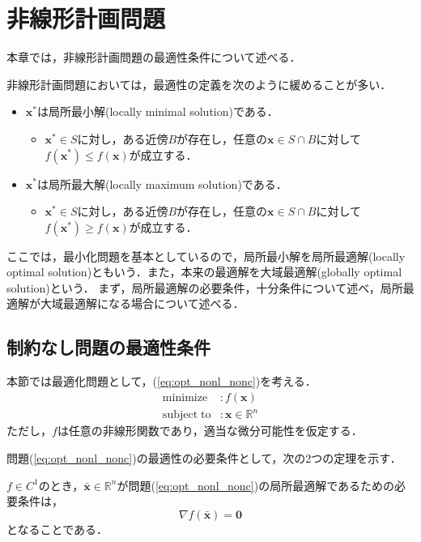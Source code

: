 \documentclass{jsreport}
\begin{document}
\chapter{非線形計画問題}
本章では，非線形計画問題の最適性条件について述べる．

非線形計画問題においては，最適性の定義を次のように緩めることが多い．
\begin{itemize}
  \item $\bm{x}^*$は局所最小解(locally minimal solution)である．
  \begin{itemize}
    \item $\bm{x}^* \in S$に対し，ある近傍$B$が存在し，任意の$\bm{x} \in S \cap B$に対して$f(\bm{x}^*) \leq f(\bm{x})$が成立する．
  \end{itemize}
  \item $\bm{x}^*$は局所最大解(locally maximum solution)である．
  \begin{itemize}
    \item $\bm{x}^* \in S$に対し，ある近傍$B$が存在し，任意の$\bm{x} \in S \cap B$に対して$f(\bm{x}^*) \geq f(\bm{x})$が成立する．
  \end{itemize}
\end{itemize}

ここでは，最小化問題を基本としているので，局所最小解を局所最適解(locally optimal solution)ともいう．また，本来の最適解を大域最適解(globally optimal solution)という．
まず，局所最適解の必要条件，十分条件について述べ，局所最適解が大域最適解になる場合について述べる．

\section{制約なし問題の最適性条件}
本節では最適化問題として，(\ref{eq:opt_nonl_nonc})を考える．
\begin{align}\label{eq:opt_nonl_nonc}
  \mathrm{minimize} &: f(\bm{x}) \nonumber\\
  \mathrm{subject \; to} &: \bm{x} \in \mathbb{R}^n
\end{align}
ただし，$f$は任意の非線形関数であり，適当な微分可能性を仮定する．

問題(\ref{eq:opt_nonl_nonc})の最適性の必要条件として，次の2つの定理を示す．
\begin{theo}\label{theo:opt_nonl_nonc_h_1}
  $f \in C^{1}$のとき，$\bar{\bm{x}} \in \mathbb{R}^n$が問題(\ref{eq:opt_nonl_nonc})の局所最適解であるための必要条件は，
  \begin{equation}
    \nabla f(\bar{\bm{x}}) = \bm{0} \nonumber
  \end{equation}
  となることである．
\end{theo}
\end{document}
